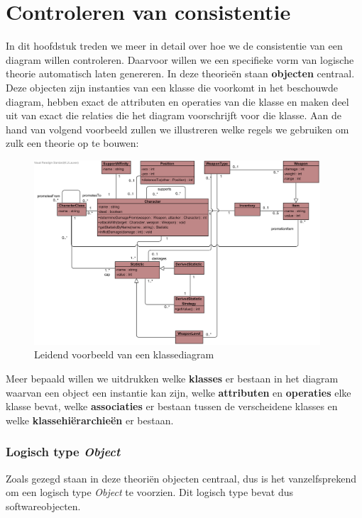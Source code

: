 \chapter{Controleren van consistentie}\label{sec:consistentie}
In dit hoofdstuk treden we meer in detail over hoe we de consistentie van een diagram willen controleren. Daarvoor willen we een specifieke vorm van logische theorie automatisch laten genereren. In deze theorie\"en staan \textbf{objecten} centraal. Deze objecten zijn instanties van een klasse die voorkomt in het beschouwde diagram, hebben exact de attributen en operaties van die klasse en maken deel uit van exact die relaties die het diagram voorschrijft voor die klasse. Aan de hand van volgend voorbeeld zullen we illustreren welke regels we gebruiken om zulk een theorie op te bouwen:

\begin{figure}[H]
	\label{fig:diagram-voorbeeld}
	\includegraphics[width=0.95\textwidth]{chap-consistentie/diagram-voorbeeld.png}
	\caption{Leidend voorbeeld van een klassediagram}
\end{figure}

Meer bepaald willen we uitdrukken welke \textbf{klasses} er bestaan in het diagram waarvan een object een instantie kan zijn, welke \textbf{attributen} en \textbf{operaties} elke klasse bevat, welke \textbf{associaties} er bestaan tussen de verscheidene klasses en welke \textbf{klassehi\"erarchie\"en} er bestaan.

\subsection{Logisch type \textit{Object}}
Zoals gezegd staan in deze theori\"en objecten centraal, dus is het vanzelfsprekend om een logisch type \textit{Object} te voorzien. Dit logisch type bevat dus softwareobjecten.

